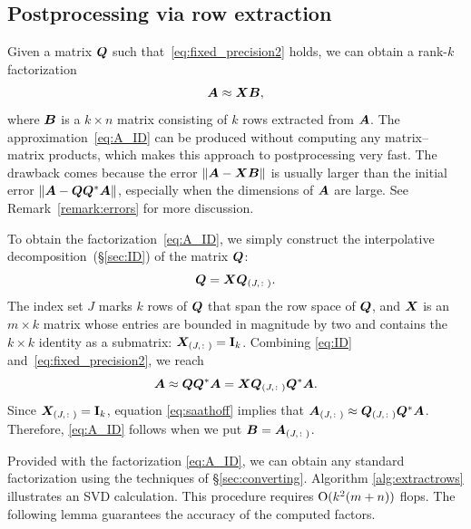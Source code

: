 \documentclass[final]{siamltex}
\begin{document}
\lsp

\subsection{Postprocessing via row extraction}
\label{sec:postrows}

Given a matrix $\bm{Q}$ such that~\eqref{eq:fixed_precision2} holds,
we can obtain a rank-$k$ factorization
\begin{equation}
\label{eq:A_ID} \mtx{A} \approx \mtx{XB},
\end{equation}
where $\bm{B}$ is a $k \times n$ matrix consisting of $k$ rows
extracted from $\bm{A}$.  The approximation~\eqref{eq:A_ID} can
be produced without computing any matrix--matrix products, which
makes this approach to postprocessing very fast.  The drawback comes
because the error $\left\Vert {\bm{A} - \bm{XB}} \right\Vert$ is usually larger than
the initial error $\left\Vert {\bm{A} - \bm{QQ}^*\bm{A}} \right\Vert$,
especially when the dimensions of $\bm{A}$ are large.
See Remark~\ref{remark:errors} for more discussion.

To obtain the factorization~\eqref{eq:A_ID}, we simply construct
the interpolative decomposition~(\S\ref{sec:ID}) of the matrix $\bm{Q}$:
\begin{equation}
\label{eq:ID}
\mtx{Q} = \mtx{X}\mtx{Q}_{(J,\colon)}.
\end{equation}
The index set $J$ marks $k$ rows of $\bm{Q}$ that span the row
space of $\bm{Q}$, and $\bm{X}$ is an $m\times k$ matrix whose
entries are bounded in magnitude by two and contains the $k\times k$
identity as a submatrix: $\bm{X}_{(J,\colon)} =
\mathbf{I}_{k}$.  Combining \eqref{eq:ID} and~\eqref{eq:fixed_precision2},
we reach
\begin{equation}
\label{eq:saathoff}
\mtx{A} \approx \mtx{Q}\mtx{Q}^{\adj}\mtx{A} =
\mtx{X}\mtx{Q}_{(J,\colon)}\mtx{Q}^{\adj}\mtx{A}.
\end{equation}
Since $\bm{X}_{(J,\colon)} = \mathbf{I}_{k}$, equation
\eqref{eq:saathoff} implies that $\bm{A}_{(J,\colon)} \approx
\bm{Q}_{(J,\colon)}\bm{Q}^{*}\bm{A}$.
Therefore, \eqref{eq:A_ID} follows when we put $\bm{B} = \bm{A}_{(J,\colon)}$.

Provided with the factorization \eqref{eq:A_ID}, we can
obtain any standard factorization using the techniques of \S\ref{sec:converting}.
Algorithm \ref{alg:extractrows} illustrates an SVD calculation.
This procedure requires $\mathrm{O}(k^{2} (m+n))$ flops.  The following lemma
guarantees the accuracy of the computed factors.
\end{document}
